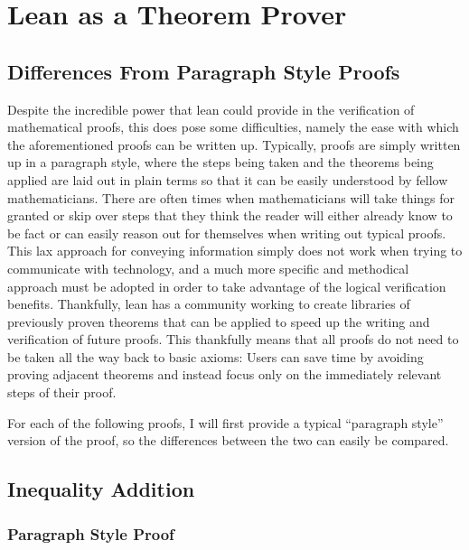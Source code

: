 \documentclass[
  letterpaper,
]{scrreprt}
\theoremstyle{remark}
\begin{document}

\hypertarget{lean-as-a-theorem-prover}{%
\chapter{Lean as a Theorem Prover}\label{lean-as-a-theorem-prover}}

\hypertarget{differences-from-paragraph-style-proofs}{%
\section{Differences From Paragraph Style
Proofs}\label{differences-from-paragraph-style-proofs}}

Despite the incredible power that lean could provide in the verification
of mathematical proofs, this does pose some difficulties, namely the
ease with which the aforementioned proofs can be written up. Typically,
proofs are simply written up in a paragraph style, where the steps being
taken and the theorems being applied are laid out in plain terms so that
it can be easily understood by fellow mathematicians. There are often
times when mathematicians will take things for granted or skip over
steps that they think the reader will either already know to be fact or
can easily reason out for themselves when writing out typical proofs.
This lax approach for conveying information simply does not work when
trying to communicate with technology, and a much more specific and
methodical approach must be adopted in order to take advantage of the
logical verification benefits. Thankfully, lean has a community working
to create libraries of previously proven theorems that can be applied to
speed up the writing and verification of future proofs. This thankfully
means that all proofs do not need to be taken all the way back to basic
axioms: Users can save time by avoiding proving adjacent theorems and
instead focus only on the immediately relevant steps of their proof.

For each of the following proofs, I will first provide a typical
``paragraph style'' version of the proof, so the differences between the
two can easily be compared.

\hypertarget{inequality-addition}{%
\section{Inequality Addition}\label{inequality-addition}}

\hypertarget{paragraph-style-proof}{%
\subsection{Paragraph Style Proof}\label{paragraph-style-proof}}
\end{document}
